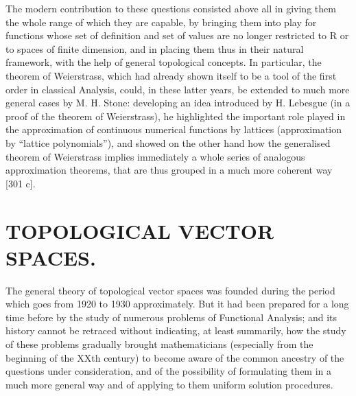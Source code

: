 The modern contribution to these questions consisted above all in giving them the whole range of which they are capable, by bringing them into play for functions whose set of definition and set of values are no longer restricted to R or to spaces of finite dimension, and in placing them thus in their natural framework, with the help of general topological concepts. In particular, the theorem of Weierstrass, which had already shown itself to be a tool of the first order in classical Analysis, could, in these latter years, be extended to much more general cases by M. H. Stone: developing an idea introduced by H. Lebesgue (in a proof of the theorem of Weierstrass), he highlighted the important role played in the approximation of continuous numerical functions by lattices (approximation by ``lattice polynomials''), and showed on the other hand how the generalised theorem of Weierstrass implies immediately a whole series of analogous approximation theorems, that are thus grouped in a much more coherent way {[}301 c{]}.

\chapter{TOPOLOGICAL VECTOR SPACES.}

The general theory of topological vector spaces was founded during the period which goes from 1920 to 1930 approximately. But it had been prepared for a long time before by the study of numerous problems of Functional Analysis; and its history cannot be retraced without indicating, at least summarily, how the study of these problems gradually brought mathematicians (especially from the beginning of the XXth century) to become aware of the common ancestry of the questions under consideration, and of the possibility of formulating them in a much more general way and of applying to them uniform solution procedures.

